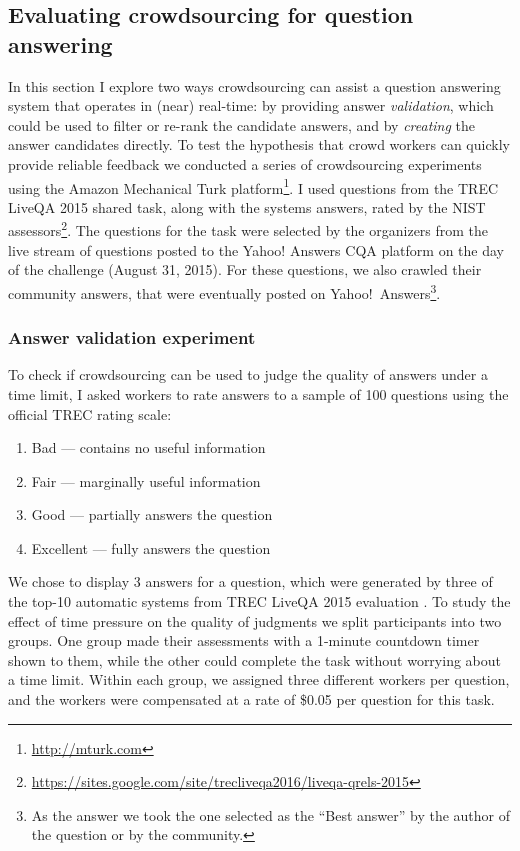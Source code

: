 \subsection{Evaluating crowdsourcing for question answering}
\label{section:non-factoid:crowdsourcing:approach}

In this section I explore two ways crowdsourcing can assist a question answering system that operates in (near) real-time: by providing answer \textit{validation}, which could be used to filter or re-rank the candidate answers, and by \textit{creating} the answer candidates directly.
To test the hypothesis that crowd workers can quickly provide reliable feedback we conducted a series of crowdsourcing experiments using the Amazon Mechanical Turk platform\footnote{\href{url}{http://mturk.com}}.
I used questions from the TREC LiveQA 2015 shared task, along with the systems answers, rated by the NIST assessors\footnote{\href{url}{https://sites.google.com/site/trecliveqa2016/liveqa-qrels-2015}}.
The questions for the task were selected by the organizers from the live stream of questions posted to the Yahoo! Answers CQA platform on the day of the challenge (August 31, 2015).
For these questions, we also crawled their community answers, that were eventually posted on Yahoo!~Answers\footnote{As the answer we took the one selected as the ``Best answer'' by the author of the question or by the community.}.

\subsubsection{Answer validation experiment}
\label{section:non-factoid:crowdsourcing:approach:validation}

To check if crowdsourcing can be used to judge the quality of answers under a time limit, I asked workers to rate answers to a sample of 100 questions using the official TREC rating scale:
\begin{enumerate}[noitemsep]
\item Bad --- contains no useful information
\item Fair --- marginally useful information
\item Good --- partially answers the question
\item Excellent --- fully answers the question
\end{enumerate}

We chose to display 3 answers for a question, which were generated by three of the top-10 automatic systems from TREC LiveQA 2015 evaluation \cite{overviewliveqa15}.
To study the effect of time pressure on the quality of judgments we split participants into two groups. One group made their assessments with a 1-minute countdown timer shown to them, while the other could complete the task without worrying about a time limit.
Within each group, we assigned three different workers per question, and the workers were compensated at a rate of \$0.05 per question for this task.

